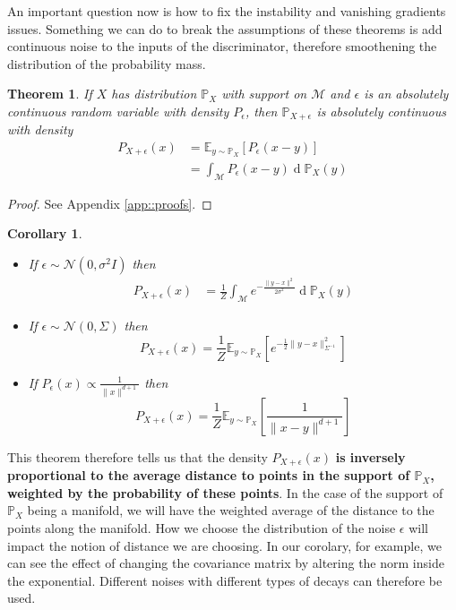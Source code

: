 \documentclass{article} %
\newcommand\EE{\mathbb{E}}
\newcommand\manM{\mathcal{M}}
\newcommand\PP{\mathbb{P}}
\renewcommand{\d}[1]{\ensuremath{\operatorname{d}\!{#1}}}
\newtheorem{coro}{Corollary}[section]
\newtheorem{theo}{Theorem}[section]
\theoremstyle{definition}
\begin{document}
An important question now is how to fix the instability and vanishing gradients issues.
Something we can do to break the assumptions of these theorems is add continuous noise to the
inputs of the discriminator, therefore smoothening the distribution of the probability mass.
\begin{theo} \label{theo::noisydist}
If $X$ has distribution $\PP_X$ with support on $\manM$ and
$\epsilon$ is an absolutely continuous random variable with density $P_\epsilon$, 
then $\PP_{X+ \epsilon}$ is
absolutely continuous with density
\begin{align*}
P_{X + \epsilon}(x) &= \EE_{y \sim \PP_X}\left[P_\epsilon(x - y)\right] \\
                    &= \int_\manM P_\epsilon(x - y) \d \PP_X(y)
\end{align*}
\end{theo}
\begin{proof}
See Appendix \autoref{app::proofs}.
\end{proof}
\begin{coro}
  \begin{itemize}
    \item If $\epsilon \sim \mathcal{N}(0, \sigma^2 I)$ then
\begin{align*}
P_{X + \epsilon}(x) &= 
  \frac{1}{Z} \int_\manM e^{-\frac{\|y-x\|^2}{2 \sigma^2}} \d \PP_X(y)
\end{align*}
    \item If $\epsilon \sim \mathcal{N}(0, \Sigma)$ then
$$ P_{X + \epsilon}(x) = 
\frac{1}{Z} \EE_{y \sim \PP_X}\left[e^{-\frac{1}{2}\|y - x\|_{\Sigma^{-1}}^2}\right]$$
    \item If $P_\epsilon(x) \propto \frac{1}{\|x\|^{d+1}}$ then 
$$ P_{X + \epsilon}(x) = 
\frac{1}{Z} \EE_{y \sim \PP_X}\left[\frac{1}{\|x-y\|^{d+1}}\right]$$
  \end{itemize}
\end{coro}
This theorem therefore tells us that the density $P_{X + \epsilon}(x)$ \textbf{is inversely proportional
to the average distance to points in the support of $\PP_X$, weighted by the probability
of these points}. In the case of the support of $\PP_X$ being a manifold, we will have the weighted
average of the distance to the points along the manifold. How we choose the distribution of the
noise $\epsilon$ will impact the notion of distance we are choosing. In our corolary, for
example, we can see the effect of changing the covariance matrix by altering the norm 
inside the exponential. Different noises with different types of decays can therefore be used.
\end{document}
